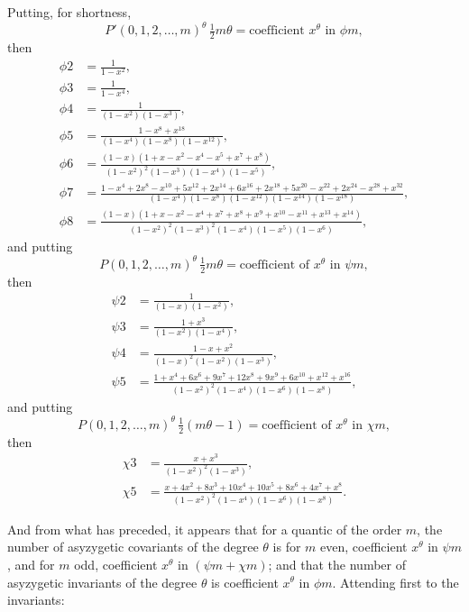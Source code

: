 \documentclass[11pt]{article}
\begin{document}
Putting, for shortness,
\[
P'(0, 1, 2, \ldots, m)^\theta\,\tfrac{1}{2}m\theta = \text{coefficient } x^\theta \text{ in } \phi m,
\]
then
\begin{align*}
\phi 2 &= \frac{1}{1 - x^2}, \\
\phi 3 &= \frac{1}{1 - x^4}, \\
\phi 4 &= \frac{1}{(1 - x^2)(1 - x^3)}, \\
\phi 5 &= \frac{1 - x^8 + x^{18}}{(1 - x^4)(1 - x^8)(1 - x^{12})}, \\
\phi 6 &= \frac{(1 - x)(1 + x - x^2 - x^4 - x^5 + x^7 + x^8)}{(1 - x^2)^2(1 - x^3)(1 - x^4)(1 - x^5)}, \\
\phi 7 &= \frac{1 - x^4 + 2 x^8 - x^{10} + 5 x^{12} + 2 x^{14} + 6 x^{16} + 2 x^{18} + 5 x^{20} - x^{22} + 2 x^{24} - x^{28} + x^{32}}{(1 - x^4)(1 - x^8)(1 - x^{12})(1 - x^{14})(1 - x^{18})}, \\
\phi 8 &= \frac{(1 - x)(1 + x - x^2 - x^4 + x^7 + x^8 + x^9 + x^{10} - x^{11} + x^{13} + x^{14})}{(1 - x^2)^2(1 - x^3)^2(1 - x^4)(1 - x^5)(1 - x^6)},
\end{align*}
and putting
\[
P(0, 1, 2, \ldots, m)^\theta\,\tfrac{1}{2}m\theta = \text{coefficient of } x^\theta \text{ in } \psi m,
\]
then
\begin{align*}
\psi 2 &= \frac{1}{(1 - x)(1 - x^2)}, \\
\psi 3 &= \frac{1 + x^3}{(1 - x^2)(1 - x^4)}, \\
\psi 4 &= \frac{1 - x + x^2}{(1 - x)^2(1 - x^2)(1 - x^3)}, \\
\psi 5 &= \frac{1 + x^4 + 6 x^6 + 9 x^7 + 12 x^8 + 9 x^9 + 6 x^{10} + x^{12} + x^{16}}{(1 - x^2)^2(1 - x^4)(1 - x^6)(1 - x^8)},
\end{align*}
and putting
\[
P(0, 1, 2, \ldots, m)^\theta\,\tfrac{1}{2}(m\theta - 1) = \text{coefficient of } x^\theta \text{ in } \chi m,
\]
then
\begin{align*}
\chi 3 &= \frac{x + x^3}{(1 - x^2)^2(1 - x^3)}, \\
\chi 5 &= \frac{x + 4 x^2 + 8 x^3 + 10 x^4 + 10 x^5 + 8 x^6 + 4 x^7 + x^8}{(1 - x^2)^2(1 - x^4)(1 - x^6)(1 - x^8)}.
\end{align*}

And from what has preceded, it appears that for a quantic of the order $m$, the number of asyzygetic covariants of the degree $\theta$ is for $m$ even, coefficient $x^\theta$ in $\psi m$, and for $m$ odd, coefficient $x^\theta$ in $(\psi m + \chi m)$; and that the number of asyzygetic invariants of the degree $\theta$ is coefficient $x^\theta$ in $\phi m$. Attending first to the invariants:
\end{document}

